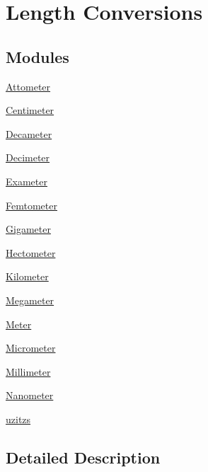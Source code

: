 \hypertarget{group___e_g_x_math-_conversions-_length_conversions}{}\section{Length Conversions}
\label{group___e_g_x_math-_conversions-_length_conversions}
\subsection*{Modules}
\begin{DoxyCompactItemize}
\item 
\mbox{\hyperlink{group___e_g_x_math-_conversions-_length_conversions-_attometer}{Attometer}}
\item 
\mbox{\hyperlink{group___e_g_x_math-_conversions-_length_conversions-_centimeter}{Centimeter}}
\item 
\mbox{\hyperlink{group___e_g_x_math-_conversions-_length_conversions-_decameter}{Decameter}}
\item 
\mbox{\hyperlink{group___e_g_x_math-_conversions-_length_conversions-_decimeter}{Decimeter}}
\item 
\mbox{\hyperlink{group___e_g_x_math-_conversions-_length_conversions-_exameter}{Exameter}}
\item 
\mbox{\hyperlink{group___e_g_x_math-_conversions-_length_conversions-_femtometer}{Femtometer}}
\item 
\mbox{\hyperlink{group___e_g_x_math-_conversions-_length_conversions-_gigameter}{Gigameter}}
\item 
\mbox{\hyperlink{group___e_g_x_math-_conversions-_length_conversions-_hectometer}{Hectometer}}
\item 
\mbox{\hyperlink{group___e_g_x_math-_conversions-_length_conversions-_kilometer}{Kilometer}}
\item 
\mbox{\hyperlink{group___e_g_x_math-_conversions-_length_conversions-_megameter}{Megameter}}
\item 
\mbox{\hyperlink{group___e_g_x_math-_conversions-_length_conversions-_meter}{Meter}}
\item 
\mbox{\hyperlink{group___e_g_x_math-_conversions-_length_conversions-_micrometer}{Micrometer}}
\item 
\mbox{\hyperlink{group___e_g_x_math-_conversions-_length_conversions-_millimeter}{Millimeter}}
\item 
\mbox{\hyperlink{group___e_g_x_math-_conversions-_length_conversions-_nanometer}{Nanometer}}
\item 
\mbox{\hyperlink{group___e_g_x_math-_conversions-_length_conversions-uzitzs}{uzitzs}}
\end{DoxyCompactItemize}


\subsection{Detailed Description}
